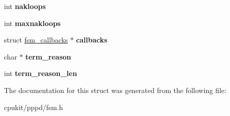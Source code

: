 \begin{DoxyCompactItemize}
\item 
\mbox{\label{structfsm_a97cd965386a76d7a8f187223461cf30f}} 
int {\bfseries nakloops}
\item 
\mbox{\label{structfsm_ada4482525ceed53e0e1379ccbf1ba039}} 
int {\bfseries maxnakloops}
\item 
\mbox{\label{structfsm_a6db46740fd29a4a7691a86792bb78d63}} 
struct \mbox{\hyperlink{structfsm__callbacks}{fsm\+\_\+callbacks}} $\ast$ {\bfseries callbacks}
\item 
\mbox{\label{structfsm_a038242ebb527a8d34ade85c164605292}} 
char $\ast$ {\bfseries term\+\_\+reason}
\item 
\mbox{\label{structfsm_a64ebd1e78575f07849760d39af3529a4}} 
int {\bfseries term\+\_\+reason\+\_\+len}
\end{DoxyCompactItemize}


The documentation for this struct was generated from the following file\+:\begin{DoxyCompactItemize}
\item 
cpukit/pppd/fsm.\+h\end{DoxyCompactItemize}

